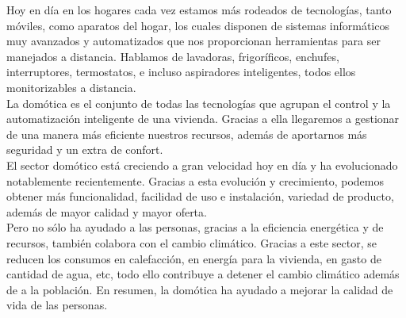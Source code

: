 
Hoy en día en los hogares cada vez estamos más rodeados de tecnologías, tanto móviles, como aparatos del hogar, los cuales disponen de sistemas informáticos muy avanzados y automatizados que nos proporcionan herramientas para ser manejados a distancia. Hablamos de lavadoras, frigoríficos, enchufes, interruptores, termostatos, e incluso aspiradores inteligentes, todos ellos monitorizables a distancia.\\

La domótica es el conjunto de todas las tecnologías que agrupan el control y la automatización inteligente de una vivienda. Gracias a ella llegaremos a gestionar de una manera más eficiente nuestros recursos, además de aportarnos más seguridad y un extra de confort.\\

El sector domótico está creciendo a gran velocidad hoy en día y ha evolucionado notablemente recientemente. Gracias a esta evolución y crecimiento, podemos obtener más funcionalidad, facilidad de uso e instalación, variedad de producto, además de mayor calidad y mayor oferta.\\

Pero no sólo ha ayudado a las personas, gracias a la eficiencia energética y de recursos, también colabora con el cambio climático. Gracias a este sector, se reducen los consumos en calefacción, en energía para la vivienda, en gasto de cantidad de agua, etc, todo ello contribuye a detener el cambio climático además de a la población.
En resumen, la domótica ha ayudado a mejorar la calidad de vida de las personas.
